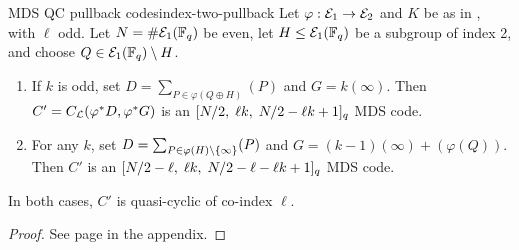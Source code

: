 \documentclass[twocolumn, 11pt]{scrartcl}
\begin{document}
\begin{construction}{MDS QC pullback codes}{index-two-pullback}
    Let $\varphi:\mathcal{E}_1\to\mathcal{E}_2$ and $K$ be as in , with $\ell$ odd. Let $N=\#\mathcal{E}_1(\mathbb{F}_q)$ be even, let $H\leq\mathcal{E}_1(\mathbb{F}_q)$ be a subgroup of index 2, and choose $Q\in\mathcal{E}_1(\mathbb{F}_q)\setminus H$.
    \begin{enumerate}[label={(\alph*)}, left=-4pt, topsep=2pt, itemsep=0pt]
        \item \label{enum:index-two-pullback-odd} If $k$ is odd, set $D=\sum_{P\in\varphi(Q\oplus H)}(P)$ and $G=k(\infty)$. Then $C'=C_\mathcal{L}(\varphi^*D,\varphi^*G)$ is an $[N/2,\;\ell k,\;N/2-\ell k+1]_q$ MDS code.
        \item \label{enum:index-two-pullback-any} For any $k$, set $D=\sum_{P\in\varphi(H)\setminus\{\infty\}}(P)$ and $G=(k-1)(\infty)+(\varphi(Q))$. Then $C'$ is an $[N/2-\ell,\;\ell k,\;N/2-\ell-\ell k+1]_q$ MDS code.
    \end{enumerate}
    In both cases, $C'$ is quasi-cyclic of co-index $\ell$.
\end{construction}

\begin{proof}
    See page \pageref{proof:index-two-pullback} in the appendix.
\end{proof}
\end{document}
